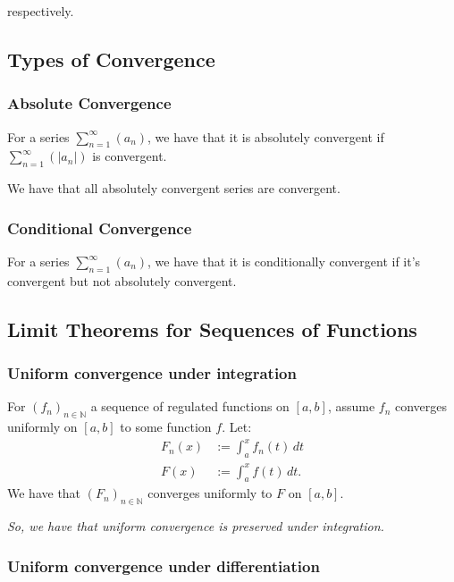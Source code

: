 \documentclass[a4paper, 12pt, twoside]{article}
\begin{document}
respectively.

\subsection{Types of Convergence}

\subsubsection{Absolute Convergence}

For a series $\sum_{n = 1}^\infty(a_n)$, we have that it is absolutely
convergent if $\sum_{n = 1}^\infty(|a_n|)$ is convergent.

\vspace{\baselineskip}

We have that all absolutely convergent series are convergent.

\subsubsection{Conditional Convergence}

For a series $\sum_{n = 1}^\infty(a_n)$, we have that it is conditionally
convergent if it's convergent but not absolutely convergent.

\subsection{Limit Theorems for Sequences of Functions}

\subsubsection{Uniform convergence under integration}

For $(f_n)_{n\in\mathbb{N}}$ a sequence of regulated functions on $[a, b]$,
assume $f_n$ converges uniformly on $[a, b]$ to some function $f$. Let:
\begin{align*}
      F_n(x) & := \int_a^x f_n(t) \, dt \\
      F(x)   & := \int_a^x f(t) \, dt.
\end{align*}
We have that $(F_n)_{n\in\mathbb{N}}$ converges uniformly to $F$ on $[a,b]$.

\vspace{\baselineskip}

\textit{So, we have that uniform convergence is preserved under integration.}

\subsubsection{Uniform convergence under differentiation}
\end{document}
